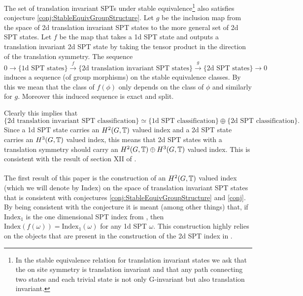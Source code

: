 \documentclass[11pt,a4paper,twoside]{article}
\numberwithin{equation}{section}
\begin{document}
\begin{conjecture}\label{conj}
	The set of translation invariant SPTs under stable equivalence\footnote{In the stable equivalence relation for translation invariant states we ask that the on site symmetry is translation invariant and that any path connecting two states and each trivial state is not only G-invariant but also translation invariant.} also satisfies conjecture \ref{conj:StableEquivGroupStructure}. Let $g$ be the inclusion map from the space of 2d translation invariant SPT states to the more general set of 2d SPT states. Let $f$ be the map that takes a 1d SPT state and outputs a translation invariant 2d SPT state by taking the tensor product in the direction of the translation symmetry. The sequence
	\begin{equation}
		0\rightarrow\{\text{1d SPT states}\}\stackrel{f}{\rightarrow}\{\text{2d translation invariant SPT states}\}\stackrel{g}{\rightarrow}\{\text{2d SPT states}\}\rightarrow 0
	\end{equation}
	induces a sequence (of group morphisms) on the stable equivalence classes. By this we mean that the class of $f(\phi)$ only depends on the class of $\phi$ and similarly for $g$. Moreover this induced sequence is exact and split.
\end{conjecture}
Clearly this implies that
\begin{equation}
	\{\text{2d translation invariant SPT classification}\}\simeq \{\text{1d SPT classification}\}\oplus \{\text{2d SPT classification}\}.
\end{equation}
Since a 1d SPT state carries an $H^2(G,\mathbb T)$ valued index and a 2d SPT state carries an $H^3(G,\mathbb T)$ valued index, this means that 2d SPT states with a translation symmetry should carry an $H^2(G,\mathbb T)\oplus H^3(G,\mathbb T)$ valued index. This is consistent with the result of section XII of \cite{Chen_2013}.
\\\\
The first result of this paper is the construction of an $H^2(G,\mathbb T)$ valued index (which we will denote by $\textrm{Index}$) on the space of translation invariant SPT states that is consistent with conjectures \ref{conj:StableEquivGroupStructure} and \ref{conj}. By being consistent with the conjecture it is meant (among other things) that, if $\textrm{Index}_1$ is the one dimensional SPT index from \cite{ogata2019classification}, then $\textrm{Index}(f(\omega))=\textrm{Index}_1(\omega)$ for any 1d SPT $\omega$. This construction highly relies on the objects that are present in the construction of the 2d SPT index in \cite{ogata2021h3gmathbb}.
\end{document}
